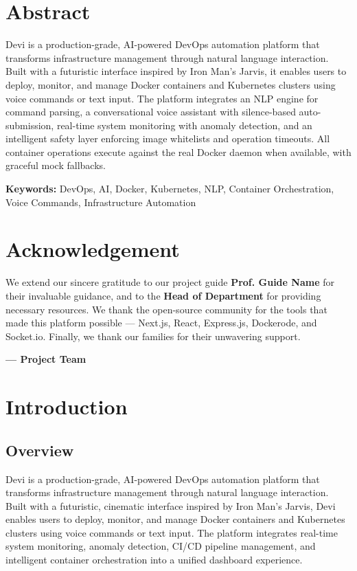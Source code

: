 \documentclass[12pt,a4paper]{report}
\begin{document}
\chapter*{Abstract}
\vspace{-0.5cm}
Devi is a production-grade, AI-powered DevOps automation platform that transforms infrastructure management through natural language interaction. Built with a futuristic interface inspired by Iron Man's Jarvis, it enables users to deploy, monitor, and manage Docker containers and Kubernetes clusters using voice commands or text input. The platform integrates an NLP engine for command parsing, a conversational voice assistant with silence-based auto-submission, real-time system monitoring with anomaly detection, and an intelligent safety layer enforcing image whitelists and operation timeouts. All container operations execute against the real Docker daemon when available, with graceful mock fallbacks.

\textbf{Keywords:} DevOps, AI, Docker, Kubernetes, NLP, Container Orchestration, Voice Commands, Infrastructure Automation

\newpage

\chapter*{Acknowledgement}
\vspace{-0.5cm}
We extend our sincere gratitude to our project guide \textbf{Prof. Guide Name} for their invaluable guidance, and to the \textbf{Head of Department} for providing necessary resources. We thank the open-source community for the tools that made this platform possible --- Next.js, React, Express.js, Dockerode, and Socket.io. Finally, we thank our families for their unwavering support.

\vspace{0.5cm}
\begin{flushright} \textbf{--- Project Team} \end{flushright}
\newpage

\tableofcontents
\newpage


\chapter{Introduction}

\section{Overview}
Devi is a production-grade, AI-powered DevOps automation platform that transforms infrastructure management through natural language interaction. Built with a futuristic, cinematic interface inspired by Iron Man's Jarvis, Devi enables users to deploy, monitor, and manage Docker containers and Kubernetes clusters using voice commands or text input. The platform integrates real-time system monitoring, anomaly detection, CI/CD pipeline management, and intelligent container orchestration into a unified dashboard experience.
\end{document}
